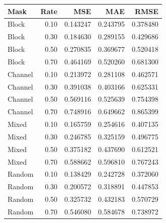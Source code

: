 \begin{tabular}{@{}lrrrr@{}}
\toprule
Mask & Rate & MSE & MAE & RMSE \\
\midrule
Block & 0.10 & 0.143247 & 0.243795 & 0.378480 \\
Block & 0.30 & 0.184630 & 0.289155 & 0.429686 \\
Block & 0.50 & 0.270835 & 0.369677 & 0.520418 \\
Block & 0.70 & 0.464169 & 0.520260 & 0.681300 \\
Channel & 0.10 & 0.213972 & 0.281108 & 0.462571 \\
Channel & 0.30 & 0.391038 & 0.403166 & 0.625331 \\
Channel & 0.50 & 0.569116 & 0.525639 & 0.754398 \\
Channel & 0.70 & 0.748916 & 0.649662 & 0.865399 \\
Mixed & 0.10 & 0.165759 & 0.254616 & 0.407135 \\
Mixed & 0.30 & 0.246785 & 0.325159 & 0.496775 \\
Mixed & 0.50 & 0.375182 & 0.437690 & 0.612521 \\
Mixed & 0.70 & 0.588662 & 0.596810 & 0.767243 \\
Random & 0.10 & 0.138429 & 0.242728 & 0.372060 \\
Random & 0.30 & 0.200572 & 0.318891 & 0.447853 \\
Random & 0.50 & 0.325732 & 0.432183 & 0.570729 \\
Random & 0.70 & 0.546080 & 0.584678 & 0.738972 \\
\bottomrule
\end{tabular}
